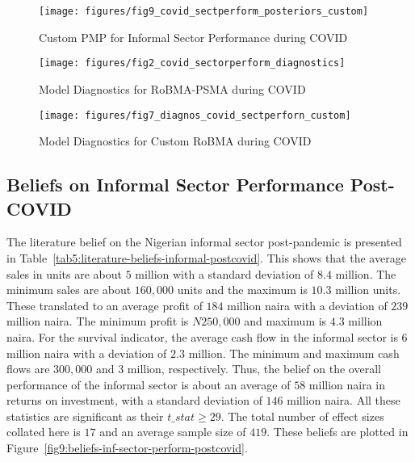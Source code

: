 \documentclass[12pt, english]{article}
\begin{document}
    \begin{figure}[H]
        \centering
        \texttt{[image: figures/fig9\_covid\_sectperform\_posteriors\_custom]}
        \caption{Custom PMP for Informal Sector Performance during COVID}
        \label{fig6:custom-pmp-covid-sectorperform-posteriors}
    \end{figure}

    \begin{figure}[H]
        \centering
        \texttt{[image: figures/fig2\_covid\_sectorperform\_diagnostics]}
        \caption{Model Diagnostics for RoBMA-PSMA during COVID}
        \label{fig7:diagnostics-robma-psma-covid-sectorperform}
    \end{figure}

    \begin{figure}[H]
        \centering
        \texttt{[image: figures/fig7\_diagnos\_covid\_sectperforn\_custom]}
        \caption{Model Diagnostics for Custom RoBMA during COVID}
        \label{fig8:diagnostics-custom-pmp-covid-sectorperform}
    \end{figure}

    \subsection{Beliefs on Informal Sector Performance Post-COVID}\label{subsec4.2:literature-beliefs-on-informal-sector-performance-post-covid-19}
    The literature belief on the Nigerian informal sector post-pandemic is presented in Table~\ref{tab5:literature-beliefs-informal-postcovid}. This shows that the average sales in units are about $5$ million with a standard deviation of $8.4$ million. The minimum sales are about $160,000$ units and the maximum is $10.3$ million units. These translated to an average profit of $184$ million naira with a deviation of $239$ million naira. The minimum profit is $N250,000$ and maximum is $4.3$ million naira. For the survival indicator, the average cash flow in the informal sector is $6$ million naira with a deviation of $2.3$ million. The minimum and maximum cash flows are $300,000$ and $3$ million, respectively. Thus, the belief on the overall performance of the informal sector is about an average of $58$ million naira in returns on investment, with a standard deviation of $146$ million naira. All these statistics are significant as their $t\_stat \geq 29$. The total number of effect sizes collated here is $17$ and an average sample size of $419$. These beliefs are plotted in Figure~\ref{fig9:beliefs-inf-sector-perform-postcovid}.
\end{document}
